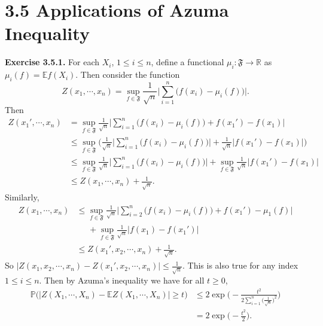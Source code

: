 \documentclass[12pt]{extarticle}
\begin{document}
\section*{3.5 Applications of Azuma Inequality}
\textbf{Exercise 3.5.1.}
For each $X_i$, $1\leq i\leq n$, define a functional $\mu_i:\mathfrak{F}\rightarrow\mathbb{R}$ as $\mu_i(f)=\mathbb{E}f(X_i)$. 
Then consider the function
\begin{equation*}
Z(x_1,\cdots,x_n)=\sup_{f\in\mathfrak{F}}\frac{1}{\sqrt{n}}\Big|\sum_{i=1}^n\big(f(x_i)-\mu_i(f)\big)\Big|.
\end{equation*}
Then
\begin{equation*}
\begin{aligned}
Z(x_1',\cdots,x_n) &= \sup_{f\in\mathfrak{F}}\frac{1}{\sqrt{n}}\Big|\sum_{i=1}^n\big(f(x_i)-\mu_i(f)\big)+f(x_1')-f(x_1)\Big| \\&
\leq \sup_{f\in\mathfrak{F}}\Big(\frac{1}{\sqrt{n}}\Big|\sum_{i=1}^n\big(f(x_i)-\mu_i(f)\big)\Big|+\frac{1}{\sqrt{n}}\Big|f(x_1')-f(x_1)\Big|\Big) \\&
\leq \sup_{f\in\mathfrak{F}}\frac{1}{\sqrt{n}}\Big|\sum_{i=1}^n\big(f(x_i)-\mu_i(f)\big)\Big|+\sup_{f\in\mathfrak{F}}\frac{1}{\sqrt{n}}\Big|f(x_1')-f(x_1)\Big| \\&
\leq Z(x_1,\cdots,x_n)+\frac{1}{\sqrt{n}}.
\end{aligned}
\end{equation*}
Similarly,
\begin{equation*}
\begin{aligned}
Z(x_1,\cdots,x_n) &\leq \sup_{f\in\mathfrak{F}}\frac{1}{\sqrt{n}}\Big|\sum_{i=2}^n\big(f(x_i)-\mu_i(f)\big)+f(x_1')-\mu_1(f)\Big| \\&\;\;\;\;\;
+\sup_{f\in\mathfrak{F}}\frac{1}{\sqrt{n}}\Big|f(x_1)-f(x_1')\Big| \\&
\leq Z(x_1',x_2,\cdots,x_n)+\frac{1}{\sqrt{n}}.
\end{aligned}
\end{equation*}
So $|Z(x_1,x_2,\cdots,x_n)-Z(x_1',x_2,\cdots,x_n)|\leq\frac{1}{\sqrt{n}}$. This is also true for any index $1\leq i\leq n$. Then by Azuma's inequality we have for all $t\geq 0$,
\begin{equation*}
\begin{aligned}
\mathbb{P}\Big(\big|Z(X_1,\cdots,X_n)-\mathbb{E}Z(X_1,\cdots,X_n)\big|\geq t\Big)&\leq 2\exp\Big(-\frac{t^2}{2\sum_{i=1}^n\big(\frac{1}{\sqrt{n}}\big)^2}\Big) \\&
=2\exp\Big(-\frac{t^2}{2}\Big).
\end{aligned}
\end{equation*}
\end{document}
